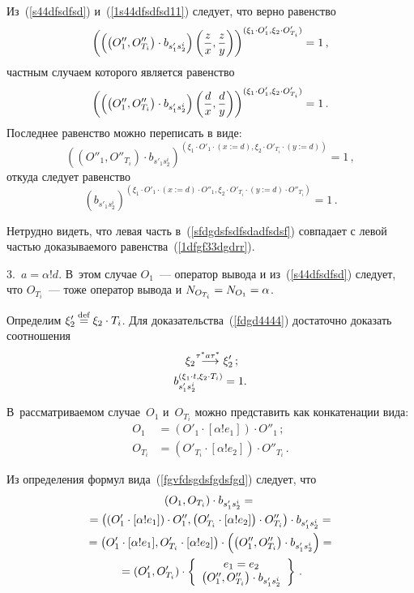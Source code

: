 \begin{multicols}{2}
Из~(\ref{s44dfsdfsd}) и~(\ref{1s44dfsdfsd11}) следует, что верно равенство
$$
\left(\left(\left(O''_1,O''_{T_i}\right)\cdot b_{s'_1s^{i}_2}\right)
\left(\displaystyle\frac{\displaystyle z\mathstrut}{\displaystyle x\mathstrut},\displaystyle\frac{\displaystyle z\mathstrut}{\displaystyle y\mathstrut}\right)\right)^{(\xi_1\cdot O'_1,\xi_2\cdot O'_{T_i})} = 1\,,
$$
частным случаем которого является равенство
$$
\left(\left(\left(O''_1,O''_{T_i}\right)\cdot b_{s'_1s^{i}_2}\right)
\left(\displaystyle\frac{\displaystyle d\mathstrut}{\displaystyle x\mathstrut},\displaystyle\frac{\displaystyle d\mathstrut}{\displaystyle y\mathstrut}\right)\right)^{(\xi_1\cdot O'_1,\xi_2\cdot O'_{T_i})} = 1\,.$$
Последнее равенство можно переписать в виде:
$$
\left(\left(O''_1, O''_{T_i}\right)\cdot b_{s'_1s^{i}_2}
\right)^{(\xi_1\cdot O'_1\cdot (x:=d),\xi_2\cdot O'_{T_i}
\cdot (y:=d))} = 1\,,
$$
откуда следует равенство
\begin{equation}
\label{sfdgdsfsdfsdadfsdsf}
\left(b_{s'_1s^{i}_2} \right)^{(\xi_1\cdot O'_1\cdot (x:=d)\cdot
O''_1,\xi_2\cdot O'_{T_i} \cdot (y:=d)\cdot O''_{T_i})} = 1\,.
\end{equation}

Нетрудно видеть, что левая часть в~(\ref{sfdgdsfsdfsdadfsdsf})
совпадает с левой частью доказываемого равенства~(\ref{1dfgf33dgdrr}).

\smallskip

3.\ $a=\alpha!d$. В~этом случае
$O_1$~--- оператор вывода и из~(\ref{s44dfsdfsd})
следует, что $O_{T_i}$~--- тоже оператор вывода и $N_{O_{T_i}}\hm = N_{O_1}\hm=\alpha$.

Определим $\xi'_2\mathbin{{\mathop{=}\limits^{\mathrm{def}}}} \xi_2\cdot T_i$.
Для доказательства~(\ref{fdgd4444}) достаточно доказать соотношения
\begin{align}
\xi_2 \;\mathop{\longrightarrow}\limits^{\!\!\!\tau^*a \tau^*}\; &\xi'_2\,;
\label{sdfsdfsdfsfs}\\
b_{s'_1s^i_2}^{(\xi_1\cdot t,\xi_2\cdot T_i)}&=1.
\label{11dfgf33dgdrr}
\end{align}

В~рассматриваемом случае~$O_1$ и~$O_{T_i}$ можно представить как
конкатенации вида:
\begin{align}
O_1&=(O'_1\cdot[\alpha!e_1])\cdot O''_1\,;\label{sdfsdafsad}\\
O_{T_i} &= (O'_{T_i}\cdot[\alpha!e_2])\cdot
O''_{T_i}\,.
\label{sdfsdafsad1}
\end{align}

Из определения формул вида~(\ref{fgvfdsgdsfgdsfgd})
 следует, что
\begin{multline}
\label{21s44dfsdfsd11}
(O_1, O_{T_i}) \cdot b_{s'_1s^{i}_2}={}\\
{}= \left(\left(O'_1\cdot[\alpha!e_1]\right)\cdot O''_1,
\left(O'_{T_i}\cdot[\alpha!e_2]\right)\cdot
O''_{T_i}\right) \cdot b_{s'_1s^{i}_2}={}\\
{}=
\left(O'_1\cdot[\alpha!e_1],
O'_{T_i}\cdot[\alpha!e_2]
\right) \cdot \left(\left(O''_1, O''_{T_i}\right)\cdot b_{s'_1s^{i}_2}\right)
={}\\
{}=
(O'_1, O'_{T_i} ) \cdot \left\{ \begin{array}{c}
e_1=e_2\\
\left(O''_1,O''_{T_i}\right)\cdot b_{s'_1s^{i}_2}
\end{array}\right\}\,.
\end{multline}


\end{multicols}
